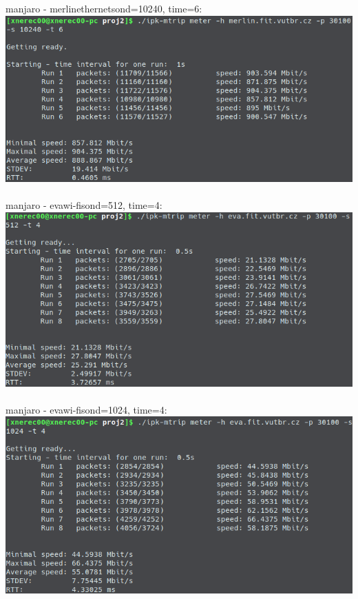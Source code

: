 \documentclass[a4paper, 11pt]{article}
\begin{document}
\newpage
\noindent manjaro - merlin\qquad ethernet\qquad sond=10240, time=6:\\
\includegraphics[scale=0.5]{pic/loc4.png}\\\\
manjaro - eva\qquad wi-fi\qquad sond=512, time=4:\\
\includegraphics[scale=0.5]{pic/loc5.png}\\\\
manjaro - eva\qquad wi-fi\qquad sond=1024, time=4:\\
\includegraphics[scale=0.5]{pic/loc7.png}\\\\
\end{document}
